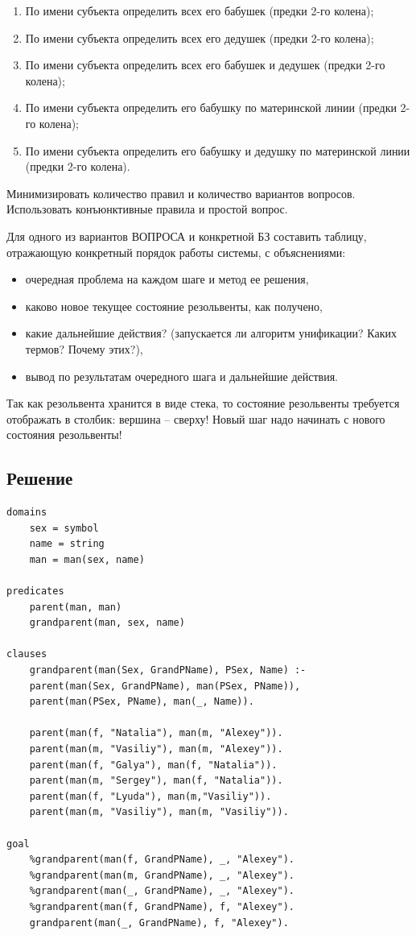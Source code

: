 \documentclass[12pt]{report}
\begin{document}
\begin{enumerate}
	\item По имени субъекта определить всех его бабушек (предки 2-го колена);
	\item По имени субъекта определить всех его дедушек (предки 2-го колена);
	\item По имени субъекта определить всех его бабушек и дедушек (предки 2-го колена);
	\item По имени субъекта определить его бабушку по материнской линии (предки 2-го колена);
	\item По имени субъекта определить его бабушку и дедушку по материнской линии (предки 2-го колена).
\end{enumerate}

Минимизировать количество правил и количество вариантов вопросов. Использовать конъюнктивные правила и простой вопрос.

Для одного из вариантов ВОПРОСА и конкретной БЗ составить таблицу, отражающую конкретный порядок работы системы, с объяснениями:

\begin{itemize}
	\item очередная проблема на каждом шаге и метод ее решения,
	\item каково новое текущее состояние резольвенты, как получено,
	\item какие дальнейшие действия? (запускается ли алгоритм унификации? Каких термов? Почему этих?),
	\item вывод по результатам очередного шага и дальнейшие действия.
\end{itemize}

Так как резольвента хранится в виде стека, то состояние резольвенты требуется отображать в столбик: вершина – сверху! Новый шаг надо начинать с нового состояния резольвенты!

\subsection*{Решение}
\begin{lstlisting}
domains
	sex = symbol
	name = string
	man = man(sex, name)

predicates
	parent(man, man)
	grandparent(man, sex, name)
	
clauses
	grandparent(man(Sex, GrandPName), PSex, Name) :-
	parent(man(Sex, GrandPName), man(PSex, PName)),
	parent(man(PSex, PName), man(_, Name)).
	
	parent(man(f, "Natalia"), man(m, "Alexey")).
	parent(man(m, "Vasiliy"), man(m, "Alexey")).
	parent(man(f, "Galya"), man(f, "Natalia")).
	parent(man(m, "Sergey"), man(f, "Natalia")).
	parent(man(f, "Lyuda"), man(m,"Vasiliy")).
	parent(man(m, "Vasiliy"), man(m, "Vasiliy")).

goal
	%grandparent(man(f, GrandPName), _, "Alexey").
	%grandparent(man(m, GrandPName), _, "Alexey").
	%grandparent(man(_, GrandPName), _, "Alexey").
	%grandparent(man(f, GrandPName), f, "Alexey").
	grandparent(man(_, GrandPName), f, "Alexey").
\end{lstlisting}
\end{document}
